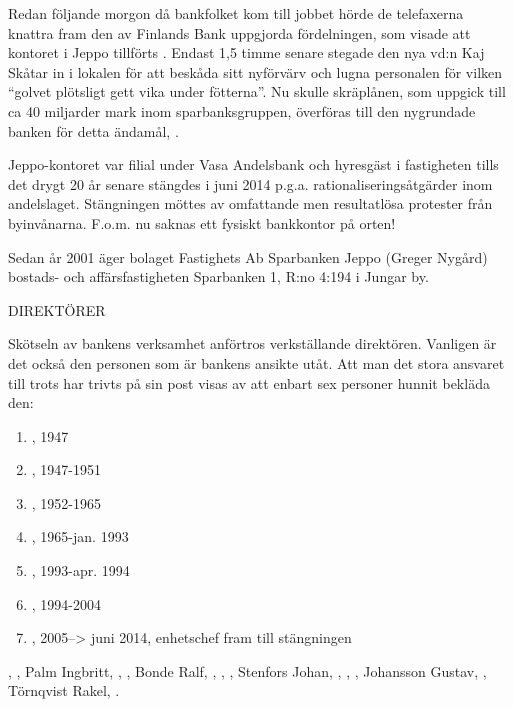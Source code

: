 Redan följande morgon då bankfolket kom till jobbet hörde de telefaxerna knattra fram den av Finlands Bank uppgjorda fördelningen, som visade att kontoret i Jeppo tillförts . Endast 1,5 timme senare stegade den nya vd:n Kaj Skåtar in i lokalen för att beskåda sitt nyförvärv och lugna personalen för vilken ``golvet plötsligt gett vika under fötterna''. Nu skulle skräplånen, som uppgick till ca 40 miljarder mark inom sparbanksgruppen, överföras till den nygrundade banken för detta ändamål, .

Jeppo-kontoret var filial under Vasa Andelsbank och hyresgäst i fastigheten tills det drygt 20 år senare stängdes i juni 2014 p.g.a. rationaliseringsåtgärder inom andelslaget. Stängningen möttes av omfattande men resultatlösa protester från byinvånarna. F.o.m. nu saknas ett fysiskt bankkontor på orten!

Sedan år 2001 äger bolaget Fastighets Ab Sparbanken Jeppo (Greger Nygård) bostads- och affärsfastigheten Sparbanken 1, R:no 4:194 i Jungar by.


DIREKTÖRER

Skötseln av bankens verksamhet anförtros verkställande direktören. Vanligen är det också den personen som är bankens ansikte utåt. Att man det stora ansvaret till trots har trivts på sin post visas av att enbart sex personer hunnit bekläda den:
\begin{enumerate}
  \item {},  1947
  \item {},   1947-1951
  \item {},   1952-1965
  \item {},  1965-jan. 1993
  \item {},  1993-apr. 1994
  \item {},  1994-2004
  \item {}, 2005--> juni 2014, enhetschef fram till stängningen
\end{enumerate}


, , Palm Ingbritt, , , Bonde Ralf, , , , Stenfors Johan, , , , Johansson Gustav, , Törnqvist Rakel, .


